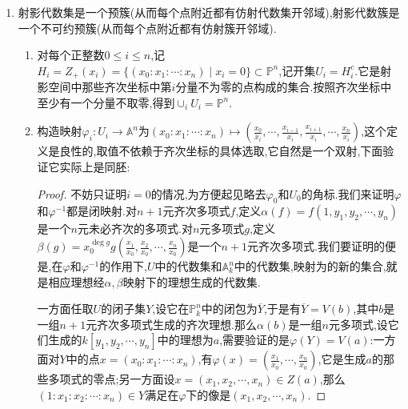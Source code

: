 \begin{enumerate}
\begin{enumerate}
\begin{proof}
    		3推1,如果$\alpha$包含某个$S_d,d>0$,那么$Z(\alpha)\subset\{0\}$,于是$Z_+(\alpha)=\emptyset$.
    	\end{proof}
    	\item $I(-)$和$Z_+(-)$是$\mathbb{P}^n$中代数集和$S=k[x_0,x_1,\cdots,x_n]$中不是$S_+=\oplus_{d>0}S_d=(x_0,x_1,\cdots,x_n)$的齐次根理想之间的反序一一对应.按照这个性质,我们称$S_+$为$S$的无关理想.
    	\item 在上述对应下,射影代数簇和不为无关理想的齐次素理想之间是反序一一对应的,特别的这说明射影空间$\mathbb{P}^n$总是不可约空间.这个证明和仿射情况一样,注意到一个齐次理想$\alpha$是素理想当且仅当,对齐次元$f,g$,从$fg\in\alpha$推出$f$和$g$中必有一个$\in\alpha$.
    \end{enumerate}
    \item 射影代数集是一个预簇(从而每个点附近都有仿射代数集开邻域),射影代数簇是一个不可约预簇(从而每个点附近都有仿射簇开邻域).
    \begin{enumerate}
    	\item 对每个正整数$0\le i\le n$,记$H_i=Z_+(x_i)=\{(x_0:x_1:\cdots:x_n)\mid x_i=0\}\subset\mathbb{P}^n$,记开集$U_i=H_i^c$.它是射影空间中那些齐次坐标中第$i$分量不为零的点构成的集合.按照齐次坐标中至少有一个分量不取零,得到$\cup_iU_i=\mathbb{P}^n$.
    	\item 构造映射$\varphi_i:U_i\to\mathbb{A}^n$为$(x_0:x_1:\cdots:x_n)\mapsto(\frac{x_0}{x_i},\cdots,\frac{x_{i-1}}{x_i},\frac{x_{i+1}}{x_i},\cdots,\frac{x_n}{x_i})$,这个定义是良性的,取值不依赖于齐次坐标的具体选取,它自然是一个双射,下面验证它实际上是同胚:
    	\begin{proof}
    		
    		不妨只证明$i=0$的情况,为方便起见略去$\varphi_0$和$U_0$的角标.我们来证明$\varphi$和$\varphi^{-1}$都是闭映射.对$n+1$元齐次多项式$f$,定义$\alpha(f)=f(1,y_1,y_2,\cdots,y_n)$是一个$n$元未必齐次的多项式.对$n$元多项式$g$,定义$\beta(g)=x_0^{\deg g}g(\frac{x_1}{x_0},\frac{x_2}{x_0},\cdots,\frac{x_n}{x_0})$是一个$n+1$元齐次多项式.我们要证明的便是,在$\varphi$和$\varphi^{-1}$的作用下,$U$中的代数集和$\mathbb{A}_k^n$中的代数集,映射为的新的集合,就是相应理想经$\alpha,\beta$映射下的理想生成的代数集.
    		
    		一方面任取$U$的闭子集$Y$,设它在$\mathbb{P}_k^n$中的闭包为$\overline{Y}$,于是有$\overline{Y}=V(b)$,其中$b$是一组$n+1$元齐次多项式生成的齐次理想.那么$\alpha(b)$是一组$n$元多项式,设它们生成的$k[y_1,y_2,\cdots,y_n]$中的理想为$a$,需要验证的是$\varphi(Y)=V(a)$:一方面对$Y$中的点$x=(x_0:x_1:\cdots:x_n)$,有$\varphi(x)=(\frac{x_1}{x_0},\cdots,\frac{x_n}{x_0})$,它是生成$a$的那些多项式的零点;另一方面设$x=(x_1,x_2,\cdots,x_n)\in Z(a)$,那么$(1:x_1:x_2:\cdots:x_n)\in Y$满足在$\varphi$下的像是$(x_1,x_2,\cdots,x_n)$.
    		

\end{proof}
\end{enumerate}
\end{enumerate}
